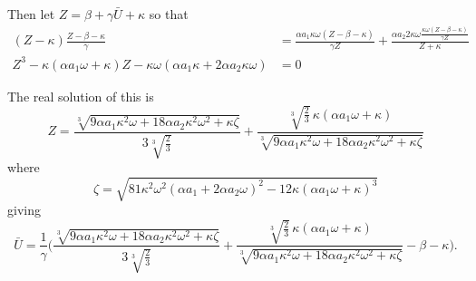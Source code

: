 \documentclass{article}
\begin{document}
Then let $Z=\beta + \gamma\bar{U}+\kappa$ so that
\begin{equation}\label{eqn:Z}
  \begin{split}
   (Z-\kappa) \frac{Z-\beta-\kappa}{\gamma} &= \frac{\alpha a_1 \kappa\omega (Z-\beta-\kappa)}{\gamma Z} + \frac{\alpha a_2 2 \kappa\omega \frac{\kappa\omega(Z-\beta-\kappa)}{\gamma Z}}{Z+\kappa}\\   
    Z^3 - \kappa(\alpha a_1 \omega+\kappa)Z - \kappa\omega (\alpha a_1 \kappa + 2 \alpha a_2 \kappa\omega) &= 0
  \end{split}
\end{equation}

The real solution of this is
\begin{equation}
  Z = \frac{ \sqrt[3]{9 \alpha a_1 \kappa^2 \omega+18 \alpha a_2 \kappa^2 \omega^2+\kappa\zeta}}{3 \sqrt[3]{\frac23}} +  
  \frac{\sqrt[3]{\frac23}\,\kappa (\alpha a_1  \omega+\kappa)}{\sqrt[3]{9 \alpha a_1 \kappa^2 \omega+18 \alpha a_2 \kappa^2 \omega^2+\kappa\zeta}}
\end{equation}  
where
\begin{equation}
\zeta= \sqrt{ 81 \kappa^2 \omega^2 (\alpha a_1 +2 \alpha a_2 \omega)^2 - 12\kappa( \alpha a_1  \omega+ \kappa)^3}
\end{equation}  
giving
\begin{equation}
  \bar{U} = \frac{1}{\gamma}\bigg(\frac{ \sqrt[3]{9 \alpha a_1 \kappa^2 \omega+18 \alpha a_2 \kappa^2 \omega^2+\kappa\zeta}}{3 \sqrt[3]{\frac23}} +  
  \frac{\sqrt[3]{\frac23}\,\kappa (\alpha a_1  \omega+\kappa)}{\sqrt[3]{9 \alpha a_1 \kappa^2 \omega+18 \alpha a_2 \kappa^2 \omega^2+\kappa\zeta}} - \beta - \kappa\bigg).
\end{equation}  
\end{document}
